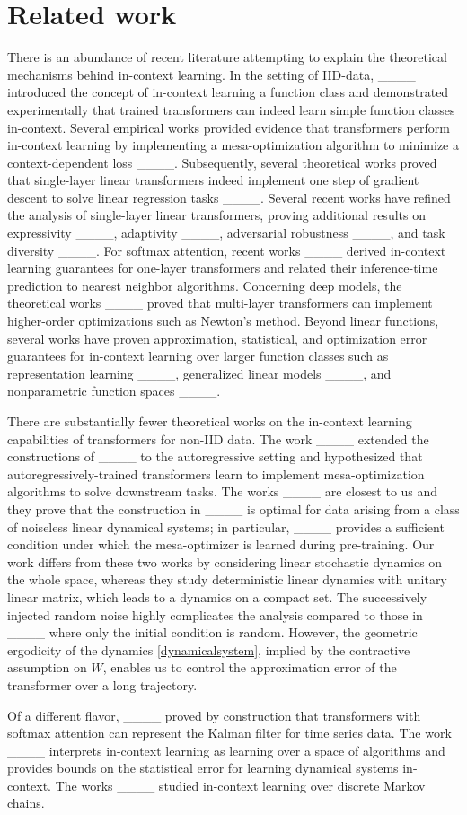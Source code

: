 \section{Related work}
There is an abundance of recent literature attempting to explain the theoretical mechanisms behind in-context learning. In the setting of IID-data, ____ introduced the concept of in-context learning a function class and demonstrated experimentally that trained transformers can indeed learn simple function classes in-context. Several empirical works provided evidence that transformers perform in-context learning by implementing a mesa-optimization algorithm to minimize a context-dependent loss ____. Subsequently, several theoretical works proved that single-layer linear transformers indeed implement one step of gradient descent to solve linear regression tasks ____.  Several recent works have refined the analysis of single-layer linear transformers, proving additional results on expressivity ____, adaptivity ____, adversarial robustness ____, and task diversity ____. For softmax attention, recent works ____ derived in-context learning guarantees for one-layer transformers and related their inference-time prediction to nearest neighbor algorithms. Concerning deep models, the theoretical works ____ proved that multi-layer transformers can implement higher-order optimizations such as Newton's method. Beyond linear functions, several works have proven approximation, statistical, and optimization error guarantees for in-context learning over larger function classes such as representation learning ____, generalized linear models ____, and nonparametric function spaces ____.

There are substantially fewer theoretical works on the in-context learning capabilities of transformers for non-IID data. The work ____ extended the constructions of ____ to the autoregressive setting and hypothesized that autoregressively-trained transformers learn to implement mesa-optimization algorithms to solve downstream tasks. The works ____ are closest to us and they prove that the construction in ____ is optimal for data arising from a class of noiseless linear dynamical systems; in particular, ____ provides a sufficient condition under which the mesa-optimizer is learned during pre-training. Our work differs from these two works by considering linear stochastic dynamics on the whole space, whereas they study deterministic linear dynamics with unitary linear matrix, which leads to a dynamics on a compact set. The successively injected random noise highly complicates the analysis compared to those in  ____ where only the initial condition is random. However, the geometric ergodicity of the dynamics  \eqref{dynamicalsystem}, implied by the contractive assumption on $W$, enables us to control the approximation error of the transformer over a long trajectory. 

Of a different flavor, ____ proved by construction that transformers with softmax attention can represent the Kalman filter for time series data. The work ____ interprets in-context learning as learning over a space of algorithms and provides bounds on the statistical error for learning dynamical systems in-context. The works ____ studied in-context learning over discrete Markov chains.